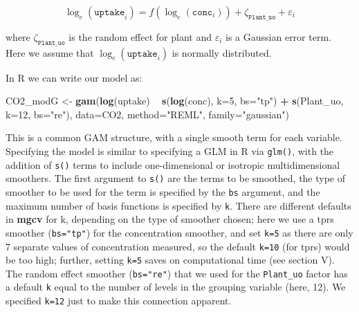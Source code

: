 \documentclass[12pt]{article}
\newenvironment{Shaded}{\begin{snugshade}}{\end{snugshade}}
\newcommand{\KeywordTok}[1]{\textcolor[rgb]{0.13,0.29,0.53}{\textbf{#1}}}
\newcommand{\DataTypeTok}[1]{\textcolor[rgb]{0.13,0.29,0.53}{#1}}
\newcommand{\DecValTok}[1]{\textcolor[rgb]{0.00,0.00,0.81}{#1}}
\newcommand{\StringTok}[1]{\textcolor[rgb]{0.31,0.60,0.02}{#1}}
\newcommand{\OperatorTok}[1]{\textcolor[rgb]{0.81,0.36,0.00}{\textbf{#1}}}
\newcommand{\NormalTok}[1]{#1}
\begin{document}
\[
\log_e(\texttt{uptake}_i) = f(\log_e(\texttt{conc}_i)) + \zeta_\texttt{Plant\_uo} + \varepsilon_i
\]

where \(\zeta_\texttt{Plant\_uo}\) is the random effect for plant and
\(\varepsilon_i\) is a Gaussian error term. Here we assume that
\(\log_e(\texttt{uptake}_i)\) is normally distributed.

In R we can write our model as:

\begin{Shaded}
\begin{Highlighting}[]
\NormalTok{CO2_modG <-}\StringTok{ }\KeywordTok{gam}\NormalTok{(}\KeywordTok{log}\NormalTok{(uptake) }\OperatorTok{~}\StringTok{ }\KeywordTok{s}\NormalTok{(}\KeywordTok{log}\NormalTok{(conc), }\DataTypeTok{k=}\DecValTok{5}\NormalTok{, }\DataTypeTok{bs=}\StringTok{"tp"}\NormalTok{) }\OperatorTok{+}
\StringTok{                  }\KeywordTok{s}\NormalTok{(Plant_uo, }\DataTypeTok{k=}\DecValTok{12}\NormalTok{, }\DataTypeTok{bs=}\StringTok{"re"}\NormalTok{),}
                \DataTypeTok{data=}\NormalTok{CO2, }\DataTypeTok{method=}\StringTok{"REML"}\NormalTok{, }\DataTypeTok{family=}\StringTok{"gaussian"}\NormalTok{)}
\end{Highlighting}
\end{Shaded}

This is a common GAM structure, with a single smooth term for each
variable. Specifying the model is similar to specifying a GLM in R via
\texttt{glm()}, with the addition of \texttt{s()} terms to include
one-dimensional or isotropic multidimensional smoothers. The first
argument to \texttt{s()} are the terms to be smoothed, the type of
smoother to be used for the term is specified by the \texttt{bs}
argument, and the maximum number of basis functions is specified by
\texttt{k}. There are different defaults in \textbf{mgcv} for k,
depending on the type of smoother chosen; here we use a tprs smoother
(\texttt{bs="tp"}) for the concentration smoother, and set \texttt{k=5}
as there are only 7 separate values of concentration measured, so the
default \texttt{k=10} (for tprs) would be too high; further, setting
\texttt{k=5} saves on computational time (see section V). The random
effect smoother (\texttt{bs="re"}) that we used for the
\texttt{Plant\_uo} factor has a default \texttt{k} equal to the number
of levels in the grouping variable (here, 12). We specified
\texttt{k=12} just to make this connection apparent.
\end{document}
